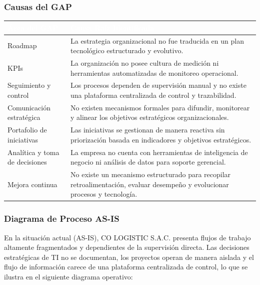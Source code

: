 \documentclass[11pt]{article}
\newcounter{none} %
\begin{document}
\subsubsection{Causas del GAP}

\vspace{0.3cm}
\setlength{\tabcolsep}{6pt}
\renewcommand{\arraystretch}{1.5}
{\def\LTcaptype{none}
\begin{longtable}[]{@{}
  >{\raggedright\arraybackslash}p{0.25\linewidth}
  >{\raggedright\arraybackslash}p{0.75\linewidth}@{}}
\rowcolor{DeepNavy}
\textcolor{white}{\textbf{Área del GAP}} & \textcolor{white}{\textbf{Causa Raíz Identificada}} \\ \hline
\endhead
\rowcolor{LightGray}
Roadmap & La estrategia organizacional no fue traducida en un plan tecnológico estructurado y evolutivo. \\ \hline
KPIs & La organización no posee cultura de medición ni herramientas automatizadas de monitoreo operacional. \\ \hline
\rowcolor{LightGray}
Seguimiento y control & Los procesos dependen de supervisión manual y no existe una plataforma centralizada de control y trazabilidad. \\ \hline
Comunicación estratégica & No existen mecanismos formales para difundir, monitorear y alinear los objetivos estratégicos organizacionales. \\ \hline
\rowcolor{LightGray}
Portafolio de iniciativas & Las iniciativas se gestionan de manera reactiva sin priorización basada en indicadores y objetivos estratégicos. \\ \hline
Analítica y toma de decisiones & La empresa no cuenta con herramientas de inteligencia de negocio ni análisis de datos para soporte gerencial. \\ \hline
\rowcolor{LightGray}
Mejora continua & No existe un mecanismo estructurado para recopilar retroalimentación, evaluar desempeño y evolucionar procesos y tecnología. \\ \hline
\end{longtable}
}

\subsubsection{Diagrama de Proceso AS-IS}

En la situación actual (AS-IS), CO LOGISTIC S.A.C. presenta flujos de trabajo altamente fragmentados y dependientes de la supervisión directa. Las decisiones estratégicas de TI no se documentan, los proyectos operan de manera aislada y el flujo de información carece de una plataforma centralizada de control, lo que se ilustra en el siguiente diagrama operativo:
\end{document}
